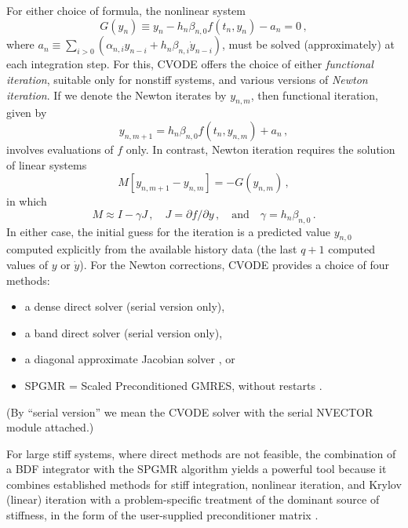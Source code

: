 For either choice of formula, the nonlinear system
\begin{equation}\label{NLS}
  G(y_n) \equiv y_n - h_n \beta_{n,0} f(t_n,y_n) - a_n = 0 \, ,
\end{equation}
where $a_n\equiv\sum_{i>0}(\alpha_{n,i}y_{n-i}+h_n\beta_{n,i}\dot{y}_{n-i})$,
must be solved (approximately) at each integration step.  For this, CVODE
offers the choice of either {\em functional iteration}, suitable only
for nonstiff systems, and various versions of {\em Newton iteration}.
If we denote the Newton iterates by $y_{n,m}$, then functional iteration,
given by
\[ y_{n,m+1} = h_n \beta_{n,0} f(t_n,y_{n,m}) + a_n \, , \]
involves evaluations of $f$ only.  In contrast, Newton iteration requires
the solution of linear systems
\begin{equation*}
  M [y_{n,m+1} - y_{n,m}] = -G(y_{n,m}) \, ,
\end{equation*}
in which
\begin{equation}\label{Newtonmat}
  M \approx I - \gamma J \, ,
  \quad J = \partial f / \partial y \, ,
  \quad \mbox{and} \quad
  \gamma = h_n \beta_{n,0} \, .
\end{equation}
In either case, the initial guess for the iteration is a predicted
value $y_{n,0}$ computed explicitly from the available history data
(the last $q+1$ computed values of $y$ or $\dot{y}$).
For the Newton corrections, CVODE provides a choice of four methods:
\begin{itemize}
\item a dense direct solver (serial version only),
\item a band direct solver (serial version only),
\item a diagonal approximate Jacobian solver \cite{RaHi:93}, or
\item SPGMR = Scaled Preconditioned GMRES, without restarts
\cite{BrHi:89}.
\end{itemize}
(By ``serial version'' we mean the CVODE solver with the serial
NVECTOR module attached.)

For large stiff systems, where direct methods are not feasible, the
combination of a BDF integrator with the SPGMR algorithm
yields a powerful tool because it combines established methods for
stiff integration, nonlinear iteration, and Krylov (linear) iteration
with a problem-specific treatment of the dominant source of stiffness,
in the form of the user-supplied preconditioner matrix \cite{BrHi:89}.

